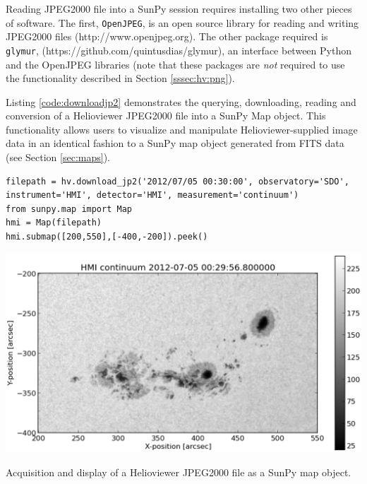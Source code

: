 Reading JPEG2000 file into a SunPy session requires installing two
other pieces of software. The first, \texttt{OpenJPEG}, is an open
source library for reading and writing JPEG2000 files
(http://www.openjpeg.org).  The other package required is
\texttt{glymur}, (https://github.com/quintusdias/glymur), an interface
between Python and the OpenJPEG libraries (note that these packages
are {\it not} required to use the functionality described in Section
\ref{sssec:hv:png}).

Listing \ref{code:downloadjp2} demonstrates the querying, downloading,
reading and conversion of a Helioviewer JPEG2000 file into a SunPy Map
object.  This functionality allows users to visualize and manipulate
Helioviewer-supplied image data in an identical fashion to a SunPy map
object generated from FITS data (see Section \ref{sec:maps}).

\begin{listing}
\begin{verbatim}
filepath = hv.download_jp2('2012/07/05 00:30:00', observatory='SDO', instrument='HMI', detector='HMI', measurement='continuum')
from sunpy.map import Map
hmi = Map(filepath)
hmi.submap([200,550],[-400,-200]).peek()
\end{verbatim}
\includegraphics[width=0.8\columnwidth]{helioviewer_hmi_continuum_jp2_to_map.eps}
\caption{Acquisition and display of a Helioviewer JPEG2000 file as a
  SunPy map object.}
\label{code:downloadjp2}
\end{listing}



%
%
